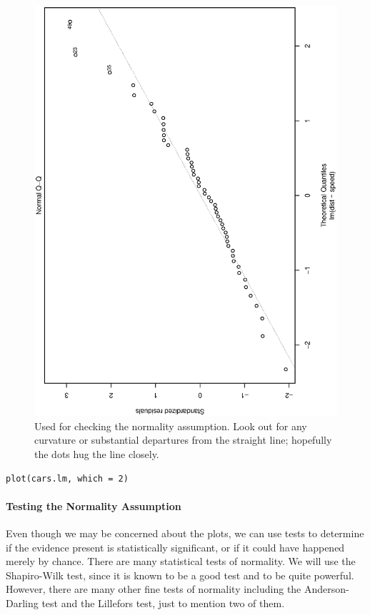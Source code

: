 \documentclass[captions=tableheading]{scrbook}
\begin{document}
\begin{figure}[th]
  \includegraphics[angle=270, totalheight=4in]{img/Normal-q-q-plot-cars.ps}
  \caption[Normal q-q plot of the residuals for the \texttt{cars} data]{\small Used for checking the normality assumption. Look out for
any curvature or substantial departures from the straight line; hopefully
the dots hug the line closely.}
  \label{fig:Normal-q-q-plot-cars}
\end{figure}


\begin{verbatim}
plot(cars.lm, which = 2)
\end{verbatim}


\paragraph*{Testing the Normality Assumption}

Even though we may be concerned about the plots, we can use tests to determine if the evidence present is statistically significant, or if it could have happened merely by chance. There are many statistical tests of normality. We will use the Shapiro-Wilk test, since it is known to be a good test and to be quite powerful. However, there are many other fine tests of normality including the Anderson-Darling test and the Lillefors test, just to mention two of them.  
\end{document}
